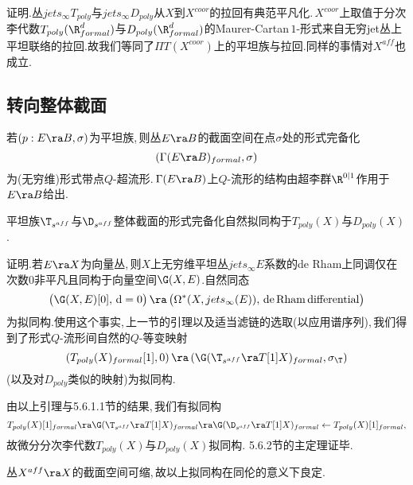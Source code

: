 证明.丛$jets_{\infty} T_{poly}$与$jets_{\infty} D_{poly}$从$X$到$X^{coor}$的拉回有典范平凡化.\,$X^{coor}$上取值于分次李代数$T_{poly}(\R^d_{formal})$与$D_{poly}(\R^d_{formal})$的Maurer-Cartan\,$1$-形式来自无穷jet丛上平坦联络的拉回.故我们等同了$\Pi T(X^{coor})$上的平坦族与拉回.同样的事情对$X^{aff}$也成立.


\subsection{转向整体截面}

若$(p:E\ra B,\sigma)$为平坦族,\,则丛$E\ra B$的截面空间在点$\sigma$处的形式完备化
$$\left( \Gamma(E\ra B)_{formal},\sigma\right)$$
为(无穷维)形式带点$Q$-超流形.\,$\Gamma(E\ra B)$上$Q$-流形的结构由超李群$\R^{0|1}$作用于$E\ra B$给出.

\begin{lem}
平坦族$\T_{s^{aff}}$与$\D_{s^{aff}}$整体截面的形式完备化自然拟同构于$T_{poly}(X)$与$D_{poly}(X)$.
\end{lem}

证明.若$E\ra X$为向量丛,\,则$X$上无穷维平坦丛$jets_{\infty} E$系数的de Rham上同调仅在次数$0$非平凡且同构于向量空间$\G(X,E)$.自然同态
$$\bigl(\G(X,E)[0],{\rm\,d}=0\bigr)  \,\ra \,\bigl(\Omega^*(X,jets_{\infty}(E))  ,{\rm \, de\,Rham  \,differential}\bigr)$$
为拟同构.使用这个事实,\,上一节的引理以及适当滤链的选取(以应用谱序列),\,我们得到了形式$Q$-流形间自然的$Q$-等变映射
$$( T_{poly}(X)_{formal}[1],0) \,\ra \,(\G( \T_{s^{aff}}\ra T[1]X)_{formal},\sigma_\T)$$
(以及对$D_{poly}$类似的映射)为拟同构.

由以上引理与5.6.1.1节的结果,\,我们有拟同构
$$T_{poly}(X)[1]_{formal} \ra
            \G( \T_{s^{aff}}\ra T[1]X)_{formal} \ra 
            \G( \D_{s^{aff}}\ra T[1]X)_{formal} \leftarrow 
            T_{poly}(X)[1]_{formal},$$
故微分分次李代数$T_{poly}(X)$与$D_{poly}(X)$拟同构.\,\,5.6.2节的主定理证毕.

丛$X^{aff}\ra X$的截面空间可缩,\,故以上拟同构在同伦的意义下良定.






